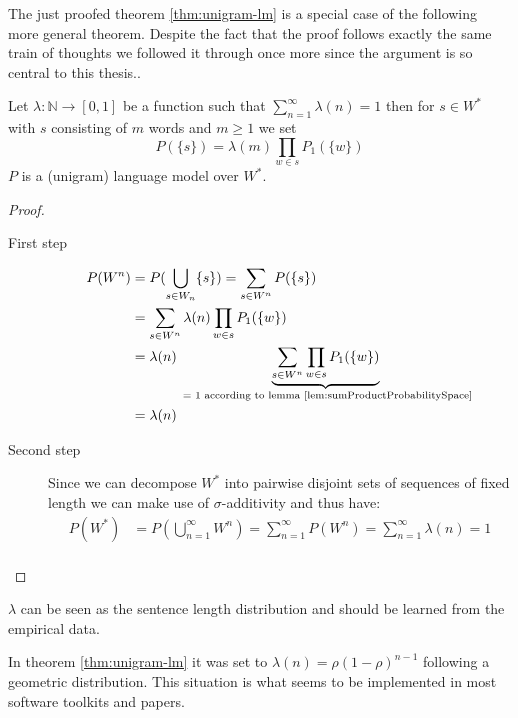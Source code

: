 \documentclass[•]{book}
\begin{document}
The just proofed theorem \ref{thm:unigram-lm} is a special case of the following more general theorem. 
Despite the fact that the proof follows exactly the same train of thoughts we followed it through once more since the argument is so central to this thesis..
\begin{theorem}\label{thm:unigramLMPlusSentenceLength}
Let $\lambda:\mathbb{N}\longrightarrow [0,1]$ be a function such that $\sum_{n=1}^\infty \lambda(n) = 1$ then for $s\in W^{*}$ with $s$ consisting of $m$ words and $m\geq 1$ we set
\begin{equation}
P(\{s\}) = \lambda(m)\prod_{w\in s}P_1(\{w\})
\end{equation}
$P$ is a (unigram) language model over $W^{*}$.
\begin{proof}
\begin{description}
\item[First step] 
\begin{align}
P(W^n) & = P(\bigcup_{s\in W_n} \{s\}) = \sum_{s\in W^n}P(\{s\}) \\
 & = \sum_{s\in W^n}\lambda(n)\prod_{w\in s}P_1(\{w\}) \\
 & = \lambda(n)\underbrace{\sum_{s\in W^n}\prod_{w\in s}P_1(\{w\})}_{\text{ = 1 according to lemma \ref{lem:sumProductProbabilitySpace}}} \\
 & = \lambda(n)
\end{align}

\item[Second step] Since we can decompose $W^{*}$ into pairwise disjoint sets of sequences of fixed length we can make use of $\sigma$-additivity and thus have: 
\begin{align}
P(W^{*}) & = P(\bigcup_{n=1}^\infty W^n) = \sum_{n=1}^\infty P(W^n) = \sum_{n=1}^\infty \lambda(n) = 1 \\
\end{align} 
\end{description}
\end{proof}
\end{theorem}  

\begin{remark}
$\lambda$ can be seen as the sentence length distribution and should be learned from the empirical data.

In theorem \ref{thm:unigram-lm} it was set to $\lambda(n) = \rho(1-\rho)^{n-1}$ following a geometric distribution. 
This situation is what seems to be implemented in most software toolkits and papers. 
\end{remark}
\end{document}
